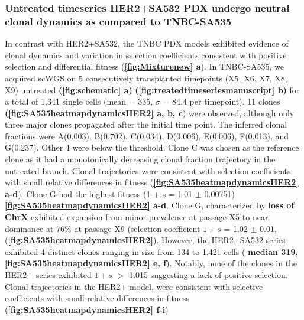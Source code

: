 \subsubsection{Untreated timeseries HER2+SA532 PDX undergo neutral clonal dynamics as compared to TNBC-SA535}
In contrast with HER2+SA532, the TNBC PDX models exhibited evidence of clonal dynamics and variation in selection coefficients consistent with positive selection and differential fitness (\textbf{\autoref{fig:Mixturenew} a}). 
In TNBC-SA535, we acquired scWGS on 5 consecutively transplanted timepoints (X5, X6, X7, X8, X9) untreated \textbf{(\autoref{fig:schematic} a)} \textbf{(\autoref{fig:treatedtimeseriesmanuscript} b)} for a total of 1,341 single cells (mean = 335, $\sigma$ = 84.4 per timepoint).
11 clones \textbf{(\autoref{fig:SA535heatmapdynamicsHER2} a, b, c}) were observed, although only three major clones propagated after the initial time point.
The inferred clonal fractions were A(0.003), B(0.702), C(0.034), D(0.006), E(0.006), F(0.013), and G(0.237). Other 4 were below the threshold.
Clone C was chosen as the reference clone as it had a monotonically decreasing clonal fraction trajectory in the untreated branch. Clonal trajectories were consistent with selection coefficients
with small relative differences in fitness (\textbf{\autoref{fig:SA535heatmapdynamicsHER2} a-d}). Clone G had the highest fitness (1 + s = 1.01 $\pm$ 0.00751) \textbf{\autoref{fig:SA535heatmapdynamicsHER2} a-d}. 
 Clone G, characterized by \textbf{loss of ChrX} exhibited expansion from minor prevalence at passage X5 to near dominance at 76\% at passage X9 (selection coefficient $1+s$ = 1.02  $\pm$  0.01, (\textbf{\autoref{fig:SA535heatmapdynamicsHER2}}). 
 However, the HER2+SA532 series exhibited 4 distinct clones ranging in size from 134 to 1,421 cells ( \textbf{median 319, \textbf{\autoref{fig:SA535heatmapdynamicsHER2} e, f}}). Notably, none of the clones in the HER2+ series exhibited $1+s$ $>$ 1.015 suggesting a lack of positive selection.
 Clonal trajectories in the HER2+ model, were consistent with selective coefficients with small relative differences in fitness (\textbf{\autoref{fig:SA535heatmapdynamicsHER2} f-i})

